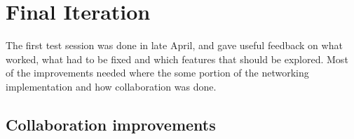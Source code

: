 


























\subsubsection*{}



\section[Final Iteration]{Final Iteration}\label{chap:finaliter}

The first test session was done in late April, and gave useful feedback on what worked, what had to be fixed and which features that should be explored. Most of the improvements needed where the some portion of the networking implementation and how collaboration was done. 




\subsection{Collaboration improvements}

